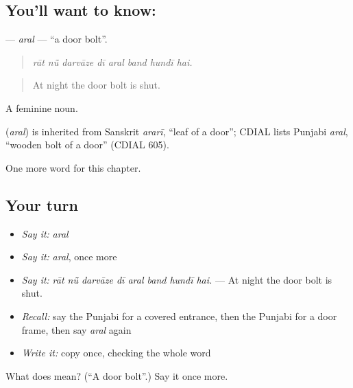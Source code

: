 \subsection*{You'll want to know: }
\textbf{} — \emph{aral} — \textquotedblleft{}a door bolt\textquotedblright{}.

\begin{quote}
       
\end{quote}

\begin{quote}
\emph{rāt nū̃ darvāze dī aral band hundī hai.}
\end{quote}

\begin{quote}
At night the door bolt is shut.
\end{quote}

A feminine noun.

\begin{cousinweb}
\textbf{} (\emph{aral}) is inherited from Sanskrit \emph{ararī}, \textquotedblleft{}leaf of a door\textquotedblright{}; CDIAL lists Punjabi \emph{aral}, \textquotedblleft{}wooden bolt of a door\textquotedblright{} (CDIAL 605).
\end{cousinweb}

\begin{grammarlens}[title={What you've built}]
One more word for this chapter.
\end{grammarlens}

\subsection*{Your turn}
\begin{itemize}
\raggedright
  \item \emph{Say it:} \emph{aral}
  \item \emph{Say it:} \emph{aral}, once more
  \item \emph{Say it:} \emph{rāt nū̃ darvāze dī aral band hundī hai.} — At night the door bolt is shut.
  \item \emph{Recall:} say the Punjabi for a covered entrance, then the Punjabi for a door frame, then say \emph{aral} again
  \item \emph{Write it:} copy \textbf{} once, checking the whole word
\end{itemize}

\begin{tcolorbox}[breakable,colback=teal!4,colframe=teal!35!black,title={Before you move on}]
What does  mean? (\textquotedblleft{}A door bolt\textquotedblright{}.) Say it once more.
\end{tcolorbox}
